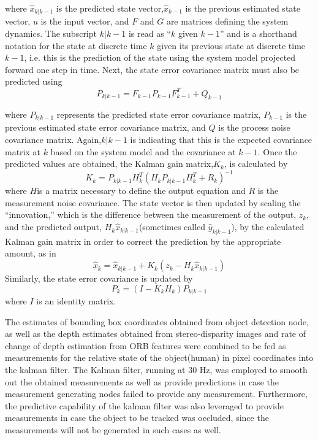 	where $\hat{x}_{k|k-1}$ is the predicted state vector,$\hat{x}_{k-1}$ is the previous estimated state vector, $u$ is the input vector, and $F$ and $G$
	are matrices defining the system dynamics. The subscript $k|k-1$ is read as “$k$ given $k-1$” and is a shorthand notation for the state at discrete time
	$k$ given its previous  state  at  discrete  time $k-1$,  i.e.  this  is  the  prediction  of  the  state  using  the  system  model projected forward one step in time.  Next, the state error covariance matrix must also be predicted using 
	\begin{equation}
	P_{k|k-1} = F_{k-1}P_{k-1}F^{T}_{k-1} + Q_{k-1}
	\end{equation}
	
	where $P_{k|k-1}$ represents  the  predicted  state  error  covariance  matrix, 
	$P_{k-1}$ is  the  previous  estimated 
	state  error  covariance  matrix,  and $Q$ is  the  process  noise  covariance  matrix. Again,$k|k-1$  is indicating  that  this  is  the  expected  covariance  matrix  at $k$ based  on  the  system  model  and  the covariance  at $k-1$.    Once  the  predicted  values  are  obtained,  the  Kalman  gain  matrix,$K_k$, is 
	calculated by 
	\begin{equation}
	K_k = P_{k|k-1}H^{T}_k(H_kP_{k|k-1}H^T_k + R_k)^{-1}
	\end{equation}
	where $H$is  a  matrix  necessary  to  define  the  output  equation  and $R$ is  the  measurement  noise covariance.  The state vector is then updated by scaling the “innovation,” which is the difference between  the  measurement  of  the  output, $z_k$,  and  the  predicted  output, $H_k\hat{x}_{k|k-1}$(sometimes 
	called $\hat{y}_{k|k-1}$),  by  the  calculated  Kalman  gain  matrix  in  order  to  correct  the  prediction  by  the appropriate amount, as in 
	\begin{equation}
	\hat{x}_k = \hat{x}_{k|k-1} + K_k(z_k - H_k\hat{x}_{k|k-1})
	\end{equation}
	Similarly, the state error covariance is updated by
	\begin{equation}
	P_k = (I - K_kH_k)P_{k|k-1}
	\end{equation}
	where $I$ is an identity matrix. 
	
	The estimates of bounding box coordinates obtained from object detection node, as well as the depth estimates obtained from stereo-disparity images and rate of change of depth estimation from ORB features were combined to be fed as measurements for the relative state of the object(human) in pixel coordinates into the kalman filter. The Kalman filter, running at 30 Hz, was employed to smooth out the obtained measurements as well as provide predictions in case the measurement generating nodes failed to provide any measurement. Furthermore, the predictive capability of the kalman filter was also leveraged to provide measurements in case the object to be tracked was occluded, since the measurements will not be generated in such cases as well.
	
